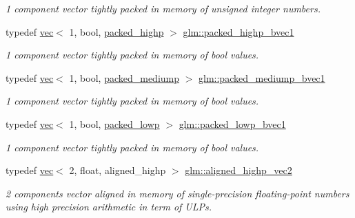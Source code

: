 \begin{DoxyCompactItemize}
\begin{DoxyCompactList}\small\item\em 1 component vector tightly packed in memory of unsigned integer numbers. \end{DoxyCompactList}\item 
typedef \mbox{\hyperlink{structglm_1_1vec}{vec}}$<$ 1, bool, \mbox{\hyperlink{namespaceglm_a36ed105b07c7746804d7fdc7cc90ff25a8e8791ee77fe079b1291f710d88031bf}{packed\+\_\+highp}} $>$ \mbox{\hyperlink{group__gtc__type__aligned_ga00ef8acfca23dca78e1baa65bb5861ac}{glm\+::packed\+\_\+highp\+\_\+bvec1}}
\begin{DoxyCompactList}\small\item\em 1 component vector tightly packed in memory of bool values. \end{DoxyCompactList}\item 
typedef \mbox{\hyperlink{structglm_1_1vec}{vec}}$<$ 1, bool, \mbox{\hyperlink{namespaceglm_a36ed105b07c7746804d7fdc7cc90ff25a9604654c3b137cd7898689fd34b25bc0}{packed\+\_\+mediump}} $>$ \mbox{\hyperlink{group__gtc__type__aligned_ga1dd6d3757af9269de00ba70b0f65a648}{glm\+::packed\+\_\+mediump\+\_\+bvec1}}
\begin{DoxyCompactList}\small\item\em 1 component vector tightly packed in memory of bool values. \end{DoxyCompactList}\item 
typedef \mbox{\hyperlink{structglm_1_1vec}{vec}}$<$ 1, bool, \mbox{\hyperlink{namespaceglm_a36ed105b07c7746804d7fdc7cc90ff25ac36a4bd74559be2c0b65bc48e5953b8b}{packed\+\_\+lowp}} $>$ \mbox{\hyperlink{group__gtc__type__aligned_gab43c5df4bb326006091ee3489bc1c367}{glm\+::packed\+\_\+lowp\+\_\+bvec1}}
\begin{DoxyCompactList}\small\item\em 1 component vector tightly packed in memory of bool values. \end{DoxyCompactList}\item 
typedef \mbox{\hyperlink{structglm_1_1vec}{vec}}$<$ 2, float, aligned\+\_\+highp $>$ \mbox{\hyperlink{group__gtc__type__aligned_ga7467c1a16f31911de3b927338434af6d}{glm\+::aligned\+\_\+highp\+\_\+vec2}}
\begin{DoxyCompactList}\small\item\em 2 components vector aligned in memory of single-\/precision floating-\/point numbers using high precision arithmetic in term of U\+L\+Ps. \end{DoxyCompactList}\item 

\end{DoxyCompactItemize}
